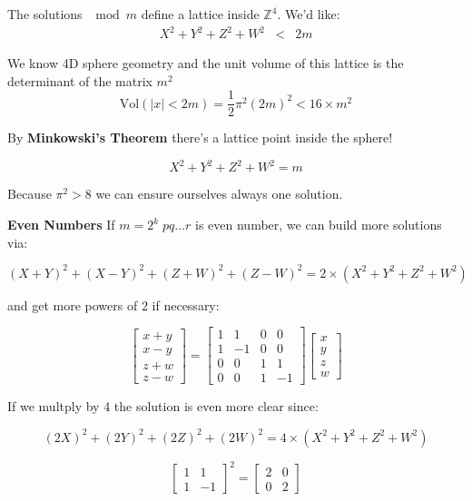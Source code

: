 \documentclass[12pt]{article}
\begin{document}
\noindent The solutions $\mod m$ define a lattice inside $\mathbb{Z}^4$.  We'd like:
\begin{eqnarray*} 
X^2 + Y^2 + Z^2 + W^2 & < &  2m  \end{eqnarray*}

\noindent We know 4D sphere geometry and the unit volume of this lattice is the determinant of the matrix $m^2$ 
$$ \mathrm{Vol}(|x| < 2m) = \frac{1}{2} \pi^2 (2m)^2  < 16 \times m^2  $$

\noindent By \textbf{Minkowski's Theorem} there's a lattice point inside the sphere!

$$ X^2 + Y^2 + Z^2 + W^2 = m $$

\noindent Because $\boxed{\pi^2 > 8}$ we can ensure ourselves always one solution.

\newpage

\textbf{Even Numbers}  If $m = 2^k \; pq\dots r$ is even number, we can build more solutions via:

$$ (X + Y)^2 + (X - Y)^2 + (Z + W)^2 + (Z - W)^2 = 2 \times (X^2 + Y^2 + Z^2 + W^2) $$

\noindent and get more powers of $2$ if necessary:

$$ \left[\begin{array}{c} x+y \\ x-y \\ \hline z+w \\ z-w \end{array} \right] = \left[\begin{array}{cr|cr} 
1 & 1 & 0 & 0 \\
1 & -1 & 0 & 0 \\ \hline
0 & 0 & 1 & 1 \\
0 & 0 & 1 & -1
\end{array}\right] 
\left[\begin{array}{c} x \\ y \\ \hline z \\ w \end{array} \right]$$

\noindent If we multply by 4 the solution is even more clear since:

$$ (2X)^2 + (2Y)^2 + (2Z)^2 + (2W)^2 = 4 \times (X^2 + Y^2 + Z^2 + W^2) $$

$$ 
\left[\begin{array}{cr} 
1 & 1 \\
1 & -1 \end{array}\right]^2 = \left[\begin{array}{cr} 
2 & 0 \\
0 & 2 \end{array}\right] $$ 
\end{document}
